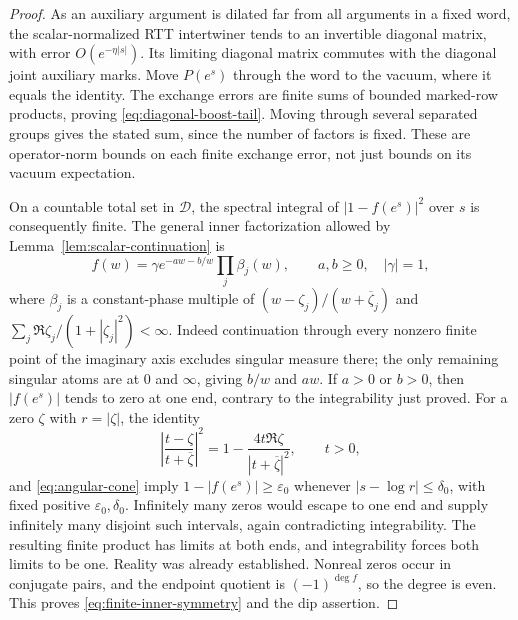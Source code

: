 \begin{proof}
As an auxiliary argument is dilated far from all arguments in a fixed
word, the scalar-normalized RTT intertwiner tends to an invertible
diagonal matrix, with error $O(e^{-\eta|s|})$.  Its limiting diagonal
matrix commutes with the diagonal joint auxiliary marks.  Move $P(e^s)$
through the word to the vacuum, where it equals the identity.  The
exchange errors are finite sums of bounded marked-row products, proving
\eqref{eq:diagonal-boost-tail}.  Moving through several separated groups
gives the stated sum, since the number of factors is fixed.  These are
operator-norm bounds on each finite exchange error, not just bounds on
its vacuum expectation.

On a countable total set in $\mathcal D$, the spectral integral of
$|1-f(e^s)|^2$ over $s$ is consequently finite.  The general inner
factorization allowed by Lemma~\ref{lem:scalar-continuation} is
\begin{equation}\label{eq:general-inner-factorization}
 f(w)=\gamma e^{-aw-b/w}\prod_j\beta_j(w),\qquad
 a,b\ge0,\quad |\gamma|=1,
\end{equation}
where $\beta_j$ is a constant-phase multiple of
$(w-\zeta_j)/(w+\overline\zeta_j)$ and
$\sum_j\Re\zeta_j/(1+|\zeta_j|^2)<\infty$.
Indeed continuation through every nonzero finite point of the imaginary
axis excludes singular measure there; the only remaining singular
atoms are at $0$ and $\infty$, giving $b/w$ and $aw$.
If $a>0$ or $b>0$, then $|f(e^s)|$ tends to zero at one end, contrary
to the integrability just proved.  For a zero $\zeta$ with
$r=|\zeta|$, the identity
\[
 \left|\frac{t-\zeta}{t+\overline\zeta}\right|^2
 =1-\frac{4t\Re\zeta}{|t+\overline\zeta|^2},\qquad t>0,
\]
and \eqref{eq:angular-cone} imply
$1-|f(e^s)|\ge\varepsilon_0$ whenever
$|s-\log r|\le\delta_0$, with fixed positive
$\varepsilon_0,\delta_0$.  Infinitely many zeros would escape to one
end and supply infinitely many disjoint such intervals, again
contradicting integrability.  The resulting finite product has limits
at both ends, and integrability forces both limits to be one.
Reality was already established.  Nonreal zeros occur in conjugate
pairs, and the endpoint quotient is $(-1)^{\deg f}$, so the degree is
even.  This proves \eqref{eq:finite-inner-symmetry} and the dip assertion.


\end{proof}
